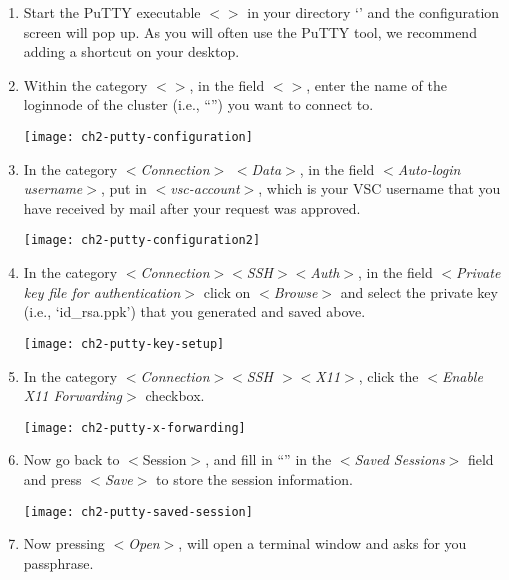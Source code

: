   \begin{enumerate}
    \item  Start the PuTTY executable $<$$>$ in your
      directory `' and the
      configuration screen will pop up. As you will often use the PuTTY tool,
      we recommend adding a shortcut on your desktop.
    \item  Within the category $<$$>$, in the field
      $<$$>$, enter the name of the loginnode of the
      \hpc cluster (i.e., ``\strong{\emph{\loginnode}}'')
      you want to connect to.

    \texttt{[image: ch2-putty-configuration]}

    \item  In the category $<$\emph{Connection}$>$ $<$\emph{Data}$>$, in
      the field $<$\emph{Auto-login username}$>$, put in
      $<$\emph{vsc-account}$>$, which is your VSC username that you have
      received by mail after your request was approved.

  \texttt{[image: ch2-putty-configuration2]}

    \item  In the category $<$\emph{Connection$>$$<$SSH$>$$<$Auth$>$}, in the
      field $<$\emph{Private key file for authentication}$>$ click on
      $<$\emph{Browse}$>$ and select the private key (i.e., `id\_rsa.ppk')
      that you generated and saved above.

  \texttt{[image: ch2-putty-key-setup]}

    \item  In the category $<$\emph{Connection$>$$<$SSH $>$$<$X11$>$}, click
      the $<$\emph{Enable X11 Forwarding}$>$ checkbox.

  \texttt{[image: ch2-putty-x-forwarding]}

    \item  Now go back to $<$Session$>$, and fill in ``\emph{\hpcname}'' in the
      $<$\emph{Saved Sessions}$>$ field and press $<$\emph{Save}$>$ to
      store the session information.

  \texttt{[image: ch2-putty-saved-session]}

    \item  Now pressing $<$\emph{Open}$>$, will open a terminal window and
      asks for you passphrase.


\end{enumerate}
